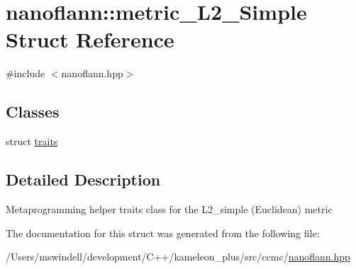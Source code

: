 \hypertarget{structnanoflann_1_1metric___l2___simple}{\section{nanoflann\-:\-:metric\-\_\-\-L2\-\_\-\-Simple Struct Reference}
\label{structnanoflann_1_1metric___l2___simple}
}


{\ttfamily \#include $<$nanoflann.\-hpp$>$}

\subsection*{Classes}
\begin{DoxyCompactItemize}
\item 
struct \hyperlink{structnanoflann_1_1metric___l2___simple_1_1traits}{traits}
\end{DoxyCompactItemize}


\subsection{Detailed Description}
Metaprogramming helper traits class for the L2\-\_\-simple (Euclidean) metric 

The documentation for this struct was generated from the following file\-:\begin{DoxyCompactItemize}
\item 
/\-Users/mswindell/development/\-C++/kameleon\-\_\-plus/src/ccmc/\hyperlink{nanoflann_8hpp}{nanoflann.\-hpp}\end{DoxyCompactItemize}
